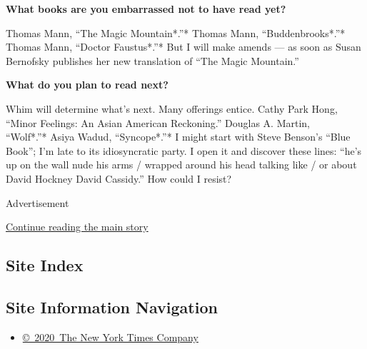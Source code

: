 \textbf{What books are you embarrassed not to have read yet?}

Thomas Mann, ``The Magic Mountain*.''* Thomas Mann, ``Buddenbrooks*.''*
Thomas Mann, ``Doctor Faustus*.''* But I will make amends --- as soon as
Susan Bernofsky publishes her new translation of ``The Magic Mountain.''

\textbf{What do you plan to read next?}

Whim will determine what's next. Many offerings entice. Cathy Park Hong,
``Minor Feelings: An Asian American Reckoning.'' Douglas A. Martin,\\
``Wolf*.''* Asiya Wadud, ``Syncope*.''* I might start with Steve
Benson's ``Blue Book''; I'm late to its idiosyncratic party. I open it
and discover these lines: ``he's up on the wall nude his arms / wrapped
around his head talking like / or about David Hockney David Cassidy.''
How could I resist?

Advertisement

\protect\hyperlink{after-bottom}{Continue reading the main story}

\hypertarget{site-index}{%
\subsection{Site Index}\label{site-index}}

\hypertarget{site-information-navigation}{%
\subsection{Site Information
Navigation}\label{site-information-navigation}}

\begin{itemize}
\tightlist
\item
  \href{https://help.nytimes3xbfgragh.onion/hc/en-us/articles/115014792127-Copyright-notice}{©~2020~The
  New York Times Company}
\end{itemize}

